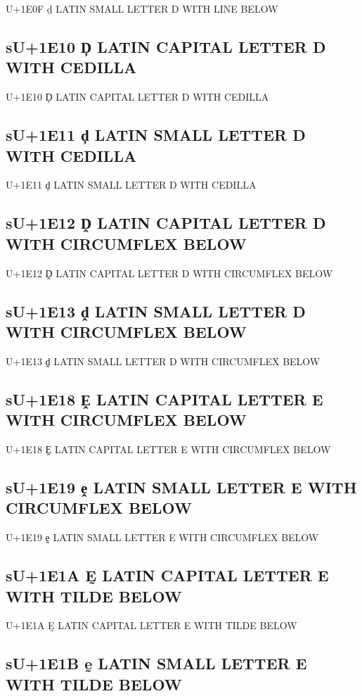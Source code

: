 U+1E0F ḏ LATIN SMALL LETTER D WITH LINE BELOW

\subsection{sU+1E10 Ḑ LATIN CAPITAL LETTER D WITH CEDILLA}

U+1E10 Ḑ LATIN CAPITAL LETTER D WITH CEDILLA

\subsection{sU+1E11 ḑ LATIN SMALL LETTER D WITH CEDILLA}

U+1E11 ḑ LATIN SMALL LETTER D WITH CEDILLA

\subsection{sU+1E12 Ḓ LATIN CAPITAL LETTER D WITH CIRCUMFLEX BELOW}

U+1E12 Ḓ LATIN CAPITAL LETTER D WITH CIRCUMFLEX BELOW

\subsection{sU+1E13 ḓ LATIN SMALL LETTER D WITH CIRCUMFLEX BELOW}

U+1E13 ḓ LATIN SMALL LETTER D WITH CIRCUMFLEX BELOW

\subsection{sU+1E18 Ḙ LATIN CAPITAL LETTER E WITH CIRCUMFLEX BELOW}

U+1E18 Ḙ LATIN CAPITAL LETTER E WITH CIRCUMFLEX BELOW

\subsection{sU+1E19 ḙ LATIN SMALL LETTER E WITH CIRCUMFLEX BELOW}

U+1E19 ḙ LATIN SMALL LETTER E WITH CIRCUMFLEX BELOW

\subsection{sU+1E1A Ḛ LATIN CAPITAL LETTER E WITH TILDE BELOW}

U+1E1A Ḛ LATIN CAPITAL LETTER E WITH TILDE BELOW

\subsection{sU+1E1B ḛ LATIN SMALL LETTER E WITH TILDE BELOW}

